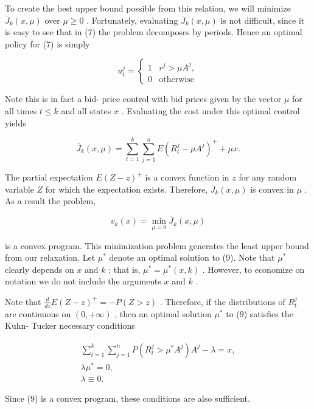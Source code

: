 To create the best upper bound possible from this relation, we will
minimize \(\overline{J}_{k}(x, \mu)\) over \(\mu \geq 0\) . Fortunately,
evaluating \(\overline{J}_{k}(x, \mu)\) is not difficult, since it is
easy to see that in (7) the problem decomposes by periods. Hence an
optimal policy for (7) is simply

\[
u_{t}^{j} = \left\{ \begin{array}{ll}1 & r^{j} > \mu A^{j}, \\ 0 & \text{otherwise} \end{array} \right.
\]

Note this is in fact a bid- price control with bid prices given by the
vector \(\mu\) for all times \(t \leq k\) and all states \(x\) .
Evaluating the cost under this optimal control yields

\[
\overline{J}_{k}(x, \mu) = \sum_{t = 1}^{k} \sum_{j = 1}^{n} E(R_{t}^{j} - \mu A^{j})^{+} + \mu x. \tag{8}
\]

The partial expectation \(E(Z - z)^{+}\) is a convex function in \(z\)
for any random variable \(Z\) for which the expectation exists.
Therefore, \(\overline{J}_{k}(x, \mu)\) is convex in \(\mu\) . As a
result the problem,

\[
v_{k}(x) = \min_{\mu = 0} \overline{J}_{k}(x, \mu) \tag{9}
\]

is a convex program. This minimization problem generates the least upper
bound from our relaxation. Let \(\mu^{*}\) denote an optimal solution to
(9). Note that \(\mu^{*}\) clearly depends on \(x\) and \(k\) ; that is,
\(\mu^{*} = \mu^{*}(x, k)\) . However, to economize on notation we do
not include the arguments \(x\) and \(k\) .

Note that \(\frac{d}{dz} E(Z - z)^{+} = - P(Z > z)\) . Therefore, if the
distributions of \(R_{t}^{j}\) are continuous on \((0, +\infty)\) , then
an optimal solution \(\mu^{*}\) to (9) satisfies the Kuhn- Tucker
necessary conditions

\[
\begin{array}{c}{{\sum_{t=1}^{k}\sum_{j=1}^{n}P(R_{t}^{j}> \mu^{*}A^{j})A^{j}-\lambda=x,}}\\ {{\lambda\mu^{*}=0,}}\\ {{\lambda\equiv0.}}\end{array} \tag{10}
\]

Since (9) is a convex program, these conditions are also sufficient.

